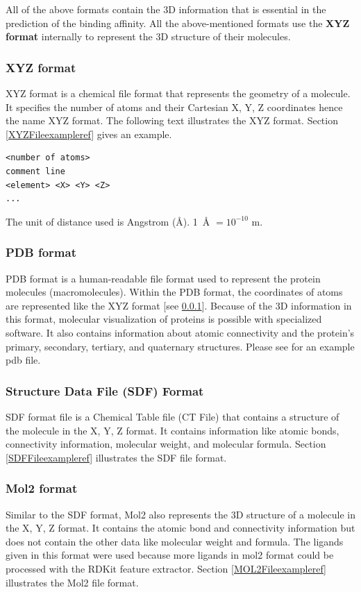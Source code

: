 \documentclass[11pt]{article}
\begin{document}
All of the above formats contain the 3D information that is essential in the prediction of the binding affinity.
All the above-mentioned formats use the \textbf{XYZ format} internally to represent the 3D structure of their molecules.

\subsubsection{XYZ format}
\label{xyz_format}
XYZ format is a chemical file format that represents the geometry of a molecule.
It specifies the number of atoms and their Cartesian X, Y, Z coordinates hence the name XYZ format.
The following text illustrates the XYZ format.
Section \ref{XYZFileexampleref} gives an example.
\cite{XYZ_format}
\begin{verbatim}
<number of atoms>
comment line
<element> <X> <Y> <Z>
...
\end{verbatim}

The unit of distance used is Angstrom (\si{\angstrom}).  \SI{1}{\angstrom} $ = 10^{-10}$ m.
\cite{XYZ_format}

\subsubsection{PDB format}
PDB format is a human-readable file format used to represent the protein molecules (macromolecules).
Within the PDB format,  the coordinates of atoms are represented like the XYZ format [see \ref{xyz_format}].
Because of the 3D information in this format,  molecular visualization of proteins is possible with specialized software. 
It also contains information about atomic connectivity and the protein's primary,  secondary,  tertiary,  and quaternary structures.
\cite{pdb_file_format}
\cite{understanding_pdb_format}
Please see \cite{examplePDBFile} for an example pdb file.


\subsubsection{Structure Data File (SDF) Format}
SDF format file is a Chemical Table file (CT File) that contains a structure of the molecule in the X, Y, Z format.
It contains information like atomic bonds,  connectivity information,  molecular weight,  and molecular formula. \cite{SDFformat}
Section \ref{SDFFileexampleref} illustrates the SDF file format.

\subsubsection{Mol2 format}
Similar to the SDF format,  Mol2 also represents the 3D structure of a molecule in the X, Y, Z format.
It contains the atomic bond and connectivity information but does not contain the other data like molecular weight and formula.
The ligands given in this format were used because more ligands in mol2 format could be processed with the RDKit feature extractor.
Section \ref{MOL2Fileexampleref} illustrates the Mol2 file format.
\end{document}
